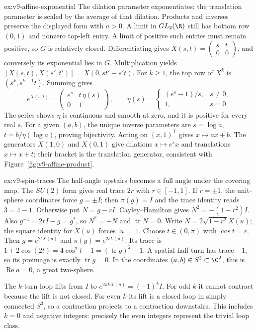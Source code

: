 \begin{solution}{ex:v9-affine-exponential}
\idea The dilation parameter exponentiates; the translation parameter is
scaled by the average of that dilation.
\writeup Products and inverses preserve the displayed form with $a>0$.
A limit in $GL_2(\R)$ still has bottom row $(0,1)$ and nonzero top-left
entry. A limit of positive such entries must remain positive, so $G$
is relatively closed. Differentiating gives
$X(s,t)=\left(\begin{smallmatrix}s&t\\0&0\end{smallmatrix}\right)$,
and conversely its exponential lies in $G$.
Multiplication yields
$[X(s,t),X(s',t')]=X(0,st'-s't)$.
For $k\ge1$, the top row of $X^k$ is $(s^k,s^{k-1}t)$.
Summing gives
\[
 e^{X(s,t)}=\begin{pmatrix}e^s&t\,\eta(s)\\0&1\end{pmatrix},
 \qquad \eta(s)=\begin{cases}(e^s-1)/s,&s\ne0,\\1,&s=0.\end{cases}
\]
The series shows $\eta$ is continuous and smooth at zero, and it is
positive for every real $s$.
For a given $(a,b)$, the unique inverse parameters are
$s=\log a$, $t=b/\eta(\log a)$, proving bijectivity.
Acting on $(x,1)^{\mathsf T}$ gives $x\mapsto ax+b$.
The generators $X(1,0)$ and $X(0,1)$ give dilations $x\mapsto e^s x$
and translations $x\mapsto x+t$; their bracket is the translation
generator, consistent with Figure~\ref{fig:v9-affine-product}.
\end{solution}
\begin{solution}{ex:v9-spin-traces}
\idea The half-angle upstairs becomes a full angle under the covering map.
\writeup The $SU(2)$ form gives real trace $2r$ with $r\in[-1,1]$.
If $r=\pm1$, the unit-sphere coordinates force $g=\pm I$;
then $\pi(g)=I$ and the trace identity reads $3=4-1$.
Otherwise put $N=g-rI$.
Cayley--Hamilton gives $N^2=-(1-r^2)I$.
Also $g^{-1}=2rI-g=g^*$, so $N^*=-N$ and $\operatorname{tr}N=0$.
Write $N=2\sqrt{1-r^2}X(u)$; the square identity for $X(u)$ forces
$|u|=1$. Choose $t\in(0,\pi)$ with $\cos t=r$.
Then $g=e^{2tX(u)}$ and $\pi(g)=e^{2tL(u)}$.
Its trace is $1+2\cos(2t)=4\cos^2t-1=(\operatorname{tr}g)^2-1$.
A spatial half-turn has trace $-1$, so its preimage is exactly
$\operatorname{tr}g=0$. In the coordinates $(a,b)\in S^3\subset\C^2$,
this is $\operatorname{Re}a=0$, a great two-sphere.

The $k$-turn loop lifts from $I$ to
$e^{2\pi kX(u)}=(-1)^kI$.
For odd $k$ it cannot contract because the lift is not closed.
For even $k$ its lift is a closed loop in simply connected $S^3$,
so a contraction projects to a contraction downstairs.
This includes $k=0$ and negative integers: precisely the even integers
represent the trivial loop class.
\end{solution}

